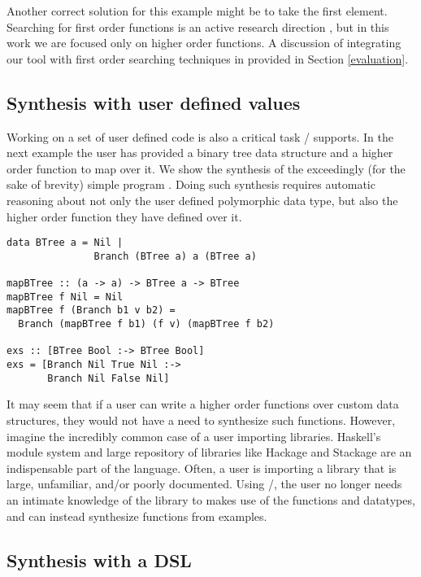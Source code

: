 Another correct solution for this example might be  to take the first element. Searching for first order functions is an active research direction \cite{DBLP:conf/aaip/Katayama09, flashFillPOPL}, but in this work we are focused only on higher order functions. A discussion of integrating our tool with first order searching techniques in provided in Section \ref{evaluation}.

\subsection{Synthesis with user defined values}

Working on a set of user defined code is also a critical task \ourTool/ supports. In the next example the user has provided a binary tree data structure and a higher order function to map over it. We show the synthesis of the exceedingly (for the sake of brevity) simple program . Doing such synthesis requires automatic reasoning about not only the user defined polymorphic data type, but also the higher order function they have defined over it.

\begin{lstlisting}
data BTree a = Nil |
               Branch (BTree a) a (BTree a)

mapBTree :: (a -> a) -> BTree a -> BTree 
mapBTree f Nil = Nil
mapBTree f (Branch b1 v b2) = 
  Branch (mapBTree f b1) (f v) (mapBTree f b2)

exs :: [BTree Bool :-> BTree Bool]
exs = [Branch Nil True Nil :->
       Branch Nil False Nil]
\end{lstlisting}

It may seem that if a user can write a higher order functions over custom data structures, they would not have a need to synthesize such functions.
However, imagine the incredibly common case of a user importing libraries.
Haskell's module system and large repository of libraries like Hackage and Stackage are an indispensable part of the language\cite{hackage,stackage}.
Often, a user is importing a library that is large, unfamiliar, and/or poorly documented.
Using \ourTool/, the user no longer needs an intimate knowledge of the library to makes use of the functions and datatypes, and can instead synthesize functions from examples.


\subsection{Synthesis with a DSL}

